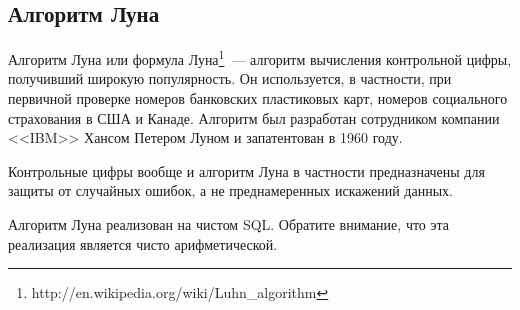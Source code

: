 \subsection{Алгоритм Луна}
Алгоритм Луна или формула Луна\footnote{http://en.wikipedia.org/wiki/Luhn\_algorithm}~--- алгоритм вычисления контрольной цифры, получивший широкую популярность.
Он используется, в частности, при первичной проверке номеров банковских пластиковых карт, номеров социального
страхования в США и Канаде. Алгоритм был разработан сотрудником компании <<IBM>> Хансом Петером Луном и
запатентован в 1960 году.

Контрольные цифры вообще и алгоритм Луна в частности предназначены для защиты от случайных ошибок,
а не преднамеренных искажений данных.

Алгоритм Луна реализован на чистом SQL. Обратите внимание, что эта реализация является чисто арифметической.


